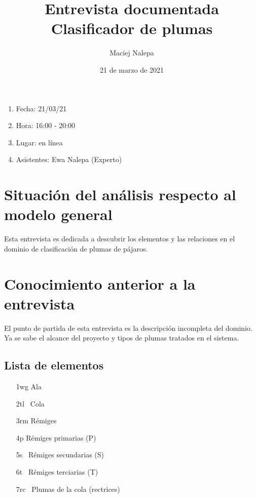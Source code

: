 \documentclass[a4paper,12pt]{article}
\title{Entrevista documentada\\ \normalsize{Clasificador de plumas}}
\author{Maciej Nalepa}
\date{21 de marzo de 2021}
\begin{document}
\maketitle

\begin{enumerate}
	\item Fecha: 21/03/21
	\item Hora: 16:00 - 20:00
	\item Lugar: en línea
	\item Asistentes: Ewa Nalepa (Experto)
\end{enumerate}

\section{Situación del análisis respecto al modelo general}
Esta entrevista es dedicada a descubrir los elementos y las relaciones en el dominio de clasificación de plumas de pájaros.

\section{Conocimiento anterior a la entrevista}
El punto de partida de esta entrevista es la descripción incompleta del dominio.
Ya se sabe el alcance del proyecto y tipos de plumas tratados en el sistema.

\subsection{Lista de elementos}
\begin{itemize}
	\item[1wg] Ala
	\item[2tl] Cola
	\item[3rm] Rémiges
	\item[4p] Rémiges primarias (P)
	\item[5s] Rémiges secundarias (S)
	\item[6t] Rémiges terciarias (T)
	\item[7rc] Plumas de la cola (rectrices)
\end{itemize}
\end{document}

